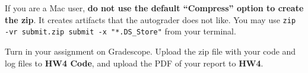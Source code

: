 \documentclass{article} %
\begin{document}
If you are a Mac user, \textbf{do not use the default ``Compress'' option to create the zip}. It creates artifacts that the autograder does not like. You may use \texttt{zip -vr submit.zip submit -x "*.DS\_Store"} from your terminal.


Turn in your assignment on Gradescope. Upload the zip file with your code and log files to \textbf{HW4 Code}, and upload the PDF of your report to \textbf{HW4}.
\end{document}
